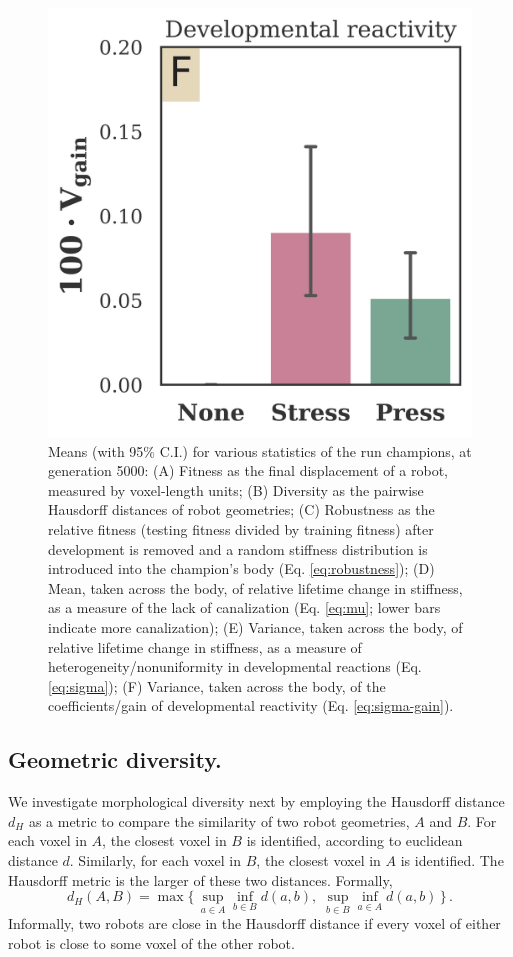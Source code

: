 \begin{figure}[t]
\includegraphics[width=0.32\linewidth]{Chapter06/img/Var_devo_gain}
\caption{\label{fig6:run_champs} 
Means (with 95\% C.I.) for various statistics of the run champions, at generation 5000: 
(A) Fitness as the final displacement of a robot, measured by voxel-length units; 
(B) Diversity as the pairwise Hausdorff distances of robot geometries; 
(C) Robustness as the relative fitness (testing fitness divided by training fitness) after development is removed and a random stiffness distribution is introduced
into the champion's body (Eq. \ref{eq:robustness});
(D) Mean, taken across the body, of relative lifetime change in stiffness, as a measure of the lack of canalization (Eq. \ref{eq:mu}; lower bars indicate more canalization);
(E) Variance, taken across the body, of relative lifetime change in stiffness, as a measure of heterogeneity/nonuniformity in developmental reactions (Eq. \ref{eq:sigma});
(F) Variance, taken across the body, of the coefficients/gain of developmental reactivity (Eq. \ref{eq:sigma-gain}).
}
\end{figure}


\subsection*{Geometric diversity.}

We investigate morphological diversity next by
employing the Hausdorff distance $d_H$ as a metric to compare the similarity of two robot geometries, $A$ and $B$.
For each voxel in $A$, the closest voxel in $B$ is identified, according to euclidean distance $d$.
Similarly, for each voxel in $B$, the closest voxel in $A$ is identified.
The Hausdorff metric is the larger of these two distances. 
Formally,
\begin{equation}
\label{eq:hausdorff}
d_H(A,B) = \max\{\,\sup_{a \in A} \inf_{b \in B} d(a,b),\; \sup_{b \in B} \inf_{a \in A} d(a,b)\,\} \, . %
\end{equation}
Informally, two robots are close in the Hausdorff distance if every voxel of either robot is close to some voxel of the other robot. 
 

